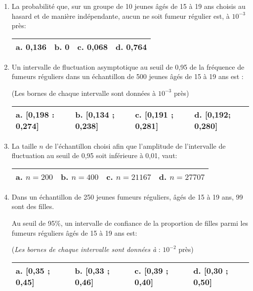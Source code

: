 \begin{enumerate}
     \item
     La probabilité que, sur un groupe de 10 jeunes âgés de 15 à 19 ans choisis au hasard et de manière indépendante, aucun ne soit fumeur régulier est, à $10^{-3}$ près:
     \begin{tabularx}{0.8\linewidth}{|*{3}{>{\centering \arraybackslash }X|}}%
          \hline
          \textbf{a}.   0,136 & \textbf{b}.   0 & \textbf{c}.   0,068 & \textbf{d}.   0,764
          \\ \hline
     \end{tabularx}
     \item
     Un intervalle de fluctuation asymptotique au seuil de 0,95 de la fréquence de fumeurs réguliers dans un échantillon de 500 jeunes âgés de 15 à 19 ans est :

     (Les bornes de chaque intervalle sont données à $10^{-3}$ près)
     \begin{tabularx}{0.8\linewidth}{|*{3}{>{\centering \arraybackslash }X|}}%
          \hline
          \textbf{a}.    [0,198 : 0,274]  & \textbf{b}.  [0,134 ; 0,238] & \textbf{c}.   [0,191 ; 0,281] & \textbf{d}.   [0,192; 0,280]
          \\ \hline
     \end{tabularx}
     \item
     La taille $n$ de l'échantillon choisi afin que l'amplitude de l'intervalle de fluctuation au seuil de 0,95 soit inférieure à 0,01, vaut:
     \begin{tabularx}{0.8\linewidth}{|*{3}{>{\centering \arraybackslash }X|}}%
          \hline
          \textbf{a}.  $n=200$ & \textbf{b}.  $n=400$ & \textbf{c}.   $n=21167$ & \textbf{d}.   $n=27707$
          \\ \hline
     \end{tabularx}
     \item
     Dans un échantillon de 250 jeunes fumeurs réguliers, âgés de 15 à 19 ans, 99 sont des filles.
     \par
     Au seuil de 95\%, un intervalle de confiance de la proportion de filles parmi les fumeurs réguliers âgés de 15 à 19 ans est:
     \par
     (\textit{Les bornes de chaque intervalle sont données à }: $10^{- 2}$ près)
     \begin{tabularx}{0.8\linewidth}{|*{3}{>{\centering \arraybackslash }X|}}%
          \hline
          \textbf{a}.  [0,35 ; 0,45] & \textbf{b}.   [0,33 ; 0,46] &  \textbf{c}.   [0,39 ; 0,40] &  \textbf{d}.   [0,30 ; 0,50]
          \\ \hline
\end{tabularx}\end{enumerate}
\begin{corrige}

\end{corrige}
